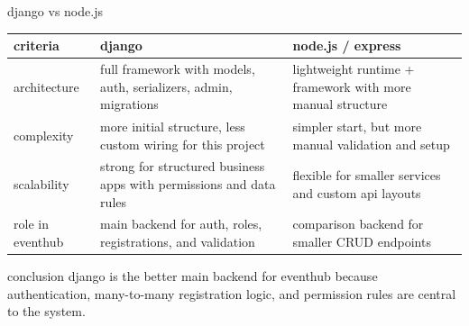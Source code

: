 \documentclass[aspectratio=169,11pt]{beamer}
\begin{document}
\begin{frame}{django vs node.js}
  \small
  \begin{tabularx}{\textwidth}{@{}lXX@{}}
    \toprule
    \textbf{criteria} & \textbf{django} & \textbf{node.js / express} \\
    \midrule
    architecture & full framework with models, auth, serializers, admin, migrations & lightweight runtime + framework with more manual structure \\
    complexity & more initial structure, less custom wiring for this project & simpler start, but more manual validation and setup \\
    scalability & strong for structured business apps with permissions and data rules & flexible for smaller services and custom api layouts \\
    role in eventhub & main backend for auth, roles, registrations, and validation & comparison backend for smaller CRUD endpoints \\
    \bottomrule
  \end{tabularx}

  \vspace{0.55em}

  \begin{alertblock}{conclusion}
    django is the better main backend for eventhub because authentication,
    many-to-many registration logic, and permission rules are central to the system.
  \end{alertblock}
\end{frame}
\end{document}
